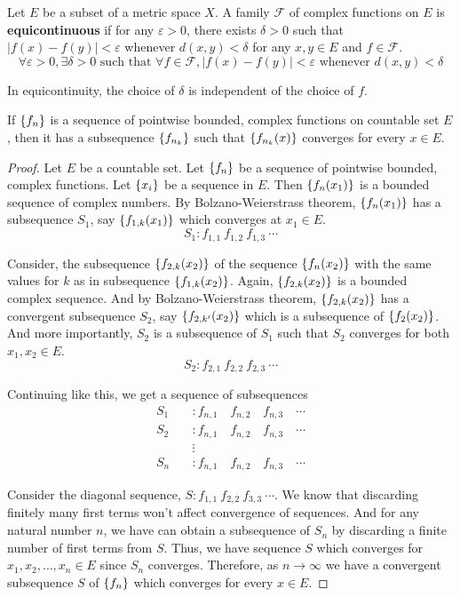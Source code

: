 \begin{definition}
	Let $E$ be a subset of a metric space $X$.
	A family $\mathscr{F}$ of complex functions on $E$ is \textbf{equicontinuous} if for any $\varepsilon > 0$, there exists $\delta > 0$ such that $|f(x)-f(y)| < \varepsilon$ whenever $d(x,y) < \delta$ for any $x,y \in E$ and $f \in \mathscr{F}$.
	\[ \forall \varepsilon > 0, \exists \delta > 0 \text{ such that } \forall f \in \mathscr{F}, |f(x)-f(y)| < \varepsilon \text{ whenever } d(x,y) < \delta \]
	\begin{commentary}
		In equicontinuity, the choice of $\delta$ is independent of the choice of $f$.
	\end{commentary}
\end{definition}

\begin{theorem}
	If $\left\{f_n\right\}$ is a sequence of pointwise bounded, complex functions on countable set $E$, then it has a subsequence $\left\{f_{n_k}\right\}$ such that $\left\{f_{n_k}(x)\right\}$ converges for every $x \in E$.
\end{theorem}
\begin{proof}
	Let $E$ be a countable set.
	Let $\left\{f_n\right\}$ be a sequence of pointwise bounded, complex functions.
	Let $\left\{x_i\right\}$ be a sequence in $E$.
	Then $\left\{f_n(x_1)\right\}$ is a bounded sequence of complex numbers.
	By Bolzano-Weierstrass theorem,  $\left\{f_n(x_1)\right\}$ has a subsequence $S_1$, say $\left\{f_{1,k}(x_1)\right\}$ which converges at $x_1 \in E$.
	\[ S_1 : f_{1,1}\ f_{1,2}\ f_{1,3}\ \cdots \]

	Consider, the subsequence $\left\{f_{2,k}(x_2)\right\}$ of the sequence $\left\{f_n(x_2)\right\}$ with the same values for $k$ as in subsequence $\left\{f_{1,k}(x_2)\right\}$.
	Again, $\left\{f_{2,k}(x_2)\right\}$ is a bounded complex sequence.
	And by Bolzano-Weierstrass theorem, $\left\{f_{2,k}(x_2)\right\}$ has a convergent subsequence $S_2$, say $\left\{f_{2,k'}(x_2)\right\}$ which is a subsequence of $\left\{f_2(x_2)\right\}$.
	And more importantly, $S_2$ is a subsequence of $S_1$ such that $S_2$ converges for both $x_1,x_2 \in E$.
	\[ S_2 : f_{2,1}\ f_{2,2}\ f_{2,3}\ \cdots \]

	Continuing like this, we get a sequence of subsequences
	\begin{align*}
		S_1 \quad & : f_{n,1}\quad f_{n,2}\quad f_{n,3}\quad \cdots \\
		S_2 \quad & : f_{n,1}\quad f_{n,2}\quad f_{n,3}\quad \cdots \\
		 & \vdots \\
		S_n \quad & : f_{n,1}\quad f_{n,2}\quad f_{n,3}\quad \cdots
	\end{align*}

	Consider the diagonal sequence, $S : f_{1,1}\ f_{2,2}\ f_{3,3}\ \cdots $.
	We know that discarding finitely many first terms won't affect convergence of sequences.
	And for any natural number $n$, we have can obtain a subsequence of $S_n$ by discarding a finite number of first terms from $S$.
	Thus, we have sequence $S$ which converges for $x_1,x_2,\dots,x_n \in E$ since $S_n$ converges.
	Therefore, as $n \to \infty$ we have a convergent subsequence $S$ of $\left\{f_n\right\}$ which converges for every $x \in E$.
\end{proof}

